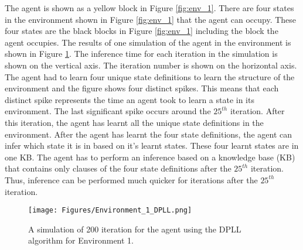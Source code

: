 The agent is shown as a yellow block in Figure \ref{fig:env_1}. There are four states in the environment shown in Figure \ref{fig:env_1} that the agent can occupy. These four states are the black blocks in Figure \ref{fig:env_1} including the block the agent occupies.
The results of one simulation of the agent in the environment is shown in Figure \ref{fig:env_1_sim}. The inference time for each iteration in the simulation is shown on the vertical axis. The iteration number is shown on the horizontal axis. The agent had to learn four unique state definitions to learn the structure of the environment and the figure shows four distinct spikes. This means that each distinct spike represents the time an agent took to learn a state in its environment. The last significant spike occurs around the $25^{th}$ iteration. After this iteration, the agent has learnt all the unique state definitions in the environment. After the agent has learnt the four state definitions, the agent can infer which state it is in based on it's learnt states.
These four learnt states are in one KB. The agent has to perform an inference based on a knowledge base (KB) that contains only clauses of the four state definitions after the $25^{th}$ iteration. Thus, inference can be performed much quicker for iterations after the $25^{th}$ iteration.



\begin{figure}[H]
    \centering
    \texttt{[image: Figures/Environment\_1\_DPLL.png]}
    \caption{A simulation of 200 iteration for the agent using the DPLL algorithm for Environment 1.}
    \label{fig:env_1_sim}
\end{figure}

\vspace{-0.7cm}


